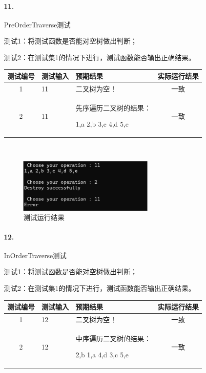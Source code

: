 \documentclass[supercite]{Experimental_Report}
\theoremstyle{definition}
\begin{document}
\paragraph{11.}PreOrderTraverse测试

测试1：将测试函数是否能对空树做出判断；

测试2：在测试集1的情况下进行，测试函数能否输出正确结果。

\vspace{0.5em}

\begin{tabular}{|c|p{2.7cm}|p{4.5cm}|c|}
	\hline
	测试编号 & 测试输入 & 预期结果 & 实际运行结果 \\
	\hline
	1 & 11 & 二叉树为空！ & 一致 \\
	\hline
	2 & 11 & 先序遍历二叉树的结果：
 
1,a 2,b 3,c 4,d 5,e & 一致 \\
	\hline
\end{tabular}

~\

\begin{figure}[H]
 	\centering
 	\includegraphics[width=0.6\textwidth]{images/二叉树测试11.png}
 	\caption{测试运行结果}
 	\label{txlab}
 \end{figure}

\paragraph{12.}InOrderTraverse测试

测试1：将测试函数是否能对空树做出判断；

测试2：在测试集1的情况下进行，测试函数能否输出正确结果。

\vspace{0.5em}

\begin{tabular}{|c|p{2.7cm}|p{4.5cm}|c|}
	\hline
	测试编号 & 测试输入 & 预期结果 & 实际运行结果 \\
	\hline
	1 & 12 & 二叉树为空！ & 一致 \\
	\hline
	2 & 12 & 中序遍历二叉树的结果：
 
2,b 1,a 4,d 3,c 5,e & 一致 \\
	\hline
\end{tabular}
\end{document}
